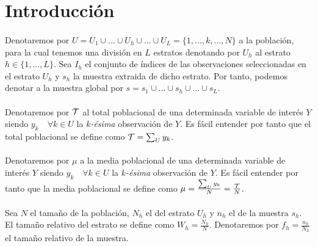 \documentclass{article}
\begin{document}
  \maketitle



  \section{Introducción}

    \paragraph{}
    Denotaremos por $U = U_1 \cup ... \cup U_h \cup... \cup U_L = \{1, ...,k,...,N\} $ a la población, para la cual tenemos una división en $L$ estratos denotando por $U_h$ al estrato $h \in \{1,..., L\}$. Sea $I_h$ el conjunto de índices de las observaciones seleccionadas en el estrato $U_h$ y $s_h$ la muestra extraida de dicho estrato. Por tanto, podemos denotar a la muestra global por $s = s_1 \cup ... \cup s_h \cup ... \cup s_L$.

    \paragraph{}
    Denotaremos por $\mathcal{T}$ al total poblacional de una determinada variable de interés $Y$ siendo $y_k \quad \forall k \in U$ la \emph{$k$-ésima} observación de $Y$. Es fácil entender por tanto que el total poblacional se define como $\mathcal{T} = \sum_U y_k$.

    \paragraph{}
    Denotaremos por $\mu$ a la media poblacional de una determinada variable de interés $Y$ siendo $y_k \quad \forall k \in U$ la \emph{$k$-ésima} observación de $Y$. Es fácil entender por tanto que la media poblacional se define como $\mu = \frac{\sum_U y_k}{N} = \frac{\mathcal{T}}{N}$.

    \paragraph{}
    Sea $N$ el tamaño de la población, $N_h$ el del estrato $U_h$ y $n_h$ el de la muestra $s_h$. El tamaño relativo del estrato se define como $W_h = \frac{N_h}{N}$. Denotaremos por $f_h = \frac{n_h}{N_h}$ el tamaño relativo de la muestra.
\end{document}
